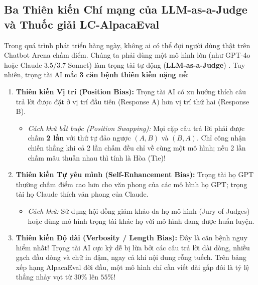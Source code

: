 \subsection{Ba Thiên kiến Chí mạng của LLM-as-a-Judge và Thuốc giải LC-AlpacaEval}

Trong quá trình phát triển hàng ngày, không ai có thể đợi người dùng thật trên Chatbot Arena chấm điểm. Chúng ta phải dùng một mô hình lớn (như GPT-4o hoặc Claude 3.5/3.7 Sonnet) làm trọng tài tự động (\textbf{LLM-as-a-Judge}) \citep{zheng2023judging}. Tuy nhiên, trọng tài AI mắc \textbf{3 căn bệnh thiên kiến nặng nề}:

\begin{enumerate}
  \item \textbf{Thiên kiến Vị trí (Position Bias):} Trọng tài AI có xu hướng thích câu trả lời được đặt ở vị trí đầu tiên (Response A) hơn vị trí thứ hai (Response B).
  \begin{itemize}
    \item \textit{Cách khử bắt buộc (Position Swapping):} Mọi cặp câu trả lời phải được chấm \textbf{2 lần} với thứ tự đảo ngược $(A, B)$ và $(B, A)$. Chỉ công nhận chiến thắng khi cả 2 lần chấm đều chỉ về cùng một mô hình; nếu 2 lần chấm mâu thuẫn nhau thì tính là Hòa (Tie)!
  \end{itemize}
  \item \textbf{Thiên kiến Tự yêu mình (Self-Enhancement Bias):} Trọng tài họ GPT thường chấm điểm cao hơn cho văn phong của các mô hình họ GPT; trọng tài họ Claude thích văn phong của Claude.
  \begin{itemize}
    \item \textit{Cách khử:} Sử dụng hội đồng giám khảo đa họ mô hình (Jury of Judges) hoặc dùng mô hình trọng tài khác họ với mô hình đang được huấn luyện.
  \end{itemize}
  \item \textbf{Thiên kiến Độ dài (Verbosity / Length Bias):} Đây là căn bệnh nguy hiểm nhất! Trọng tài AI cực kỳ dễ bị lừa bởi các câu trả lời dài dòng, nhiều gạch đầu dòng và chữ in đậm, ngay cả khi nội dung rỗng tuếch. Trên bảng xếp hạng AlpacaEval đời đầu, một mô hình chỉ cần viết dài gấp đôi là tỷ lệ thắng nhảy vọt từ $30\%$ lên $55\%$!
\end{enumerate}

